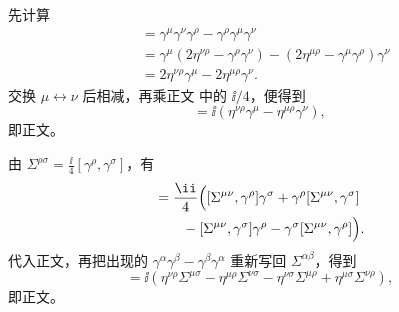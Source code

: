 \begin{derivation}
先计算
\begin{align*}
 [\gamma^\mu\gamma^\nu,\gamma^\rho]
 &=\gamma^\mu\gamma^\nu\gamma^\rho
 -\gamma^\rho\gamma^\mu\gamma^\nu\\
 &=\gamma^\mu(2\eta^{\nu\rho}-\gamma^\rho\gamma^\nu)
 -(2\eta^{\mu\rho}-\gamma^\mu\gamma^\rho)\gamma^\nu\\
 &=2\eta^{\nu\rho}\gamma^\mu-2\eta^{\mu\rho}\gamma^\nu.
\end{align*}
交换 $\mu\leftrightarrow\nu$ 后相减，再乘正文 中的 $\ii/4$，便得到
\begin{equation*}
 [\Sigma^{\mu\nu},\gamma^\rho]
 =\ii(\eta^{\nu\rho}\gamma^\mu-\eta^{\mu\rho}\gamma^\nu),
\end{equation*}
即正文。

由 $\Sigma^{\rho\sigma}=\frac{\ii}{4}[\gamma^\rho,\gamma^\sigma]$，有
\begin{align*}
 [\Sigma^{\mu\nu},\Sigma^{\rho\sigma}]
 &=\frac{\ii}{4}\Bigl(
 [\Sigma^{\mu\nu},\gamma^\rho]\gamma^\sigma
 +\gamma^\rho[\Sigma^{\mu\nu},\gamma^\sigma]\\
 &\qquad-[\Sigma^{\mu\nu},\gamma^\sigma]\gamma^\rho
 -\gamma^\sigma[\Sigma^{\mu\nu},\gamma^\rho]\Bigr).
\end{align*}
代入正文，再把出现的 $\gamma^\alpha\gamma^\beta-\gamma^\beta\gamma^\alpha$ 重新写回 $\Sigma^{\alpha\beta}$，得到
\begin{equation*}
 [\Sigma^{\mu\nu},\Sigma^{\rho\sigma}]
 =\ii\left(
 \eta^{\nu\rho}\Sigma^{\mu\sigma}
 -\eta^{\mu\rho}\Sigma^{\nu\sigma}
 -\eta^{\nu\sigma}\Sigma^{\mu\rho}
 +\eta^{\mu\sigma}\Sigma^{\nu\rho}
 \right),
\end{equation*}
即正文。
\end{derivation}

